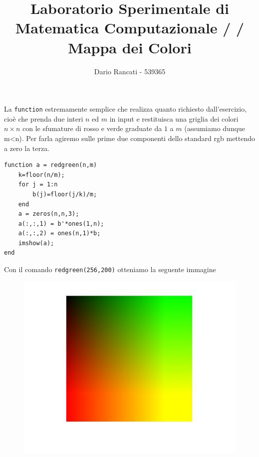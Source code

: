 \documentclass{article}
\title{\textbf{Laboratorio Sperimentale di Matematica Computazionale / / Mappa dei Colori}}
\author{Dario Rancati - 539365}
\begin{document}
\maketitle

\noindent
La \texttt{function} estremamente semplice che realizza quanto richiesto dall'esercizio, cioè che prenda due interi $n$ ed $m$ in input e restituisca una griglia dei colori $n \times n$ con le sfumature di rosso e verde graduate da $1$ a $m$ (assumiamo dunque m<n). Per farla agiremo sulle prime due componenti dello standard rgb mettendo a zero la terza.

\begin{lstlisting}
function a = redgreen(n,m) 
    k=floor(n/m);
    for j = 1:n
        b(j)=floor(j/k)/m;
    end      
    a = zeros(n,n,3);
    a(:,:,1) = b'*ones(1,n);
    a(:,:,2) = ones(n,1)*b; 
    imshow(a);
end
\end{lstlisting}

\noindent
Con il comando \texttt{redgreen(256,200)} otteniamo la seguente immagine

\begin{figure}[h!]
\centering
\includegraphics[width=\textwidth]{redgreen.jpg}
\end{figure}
\end{document}
